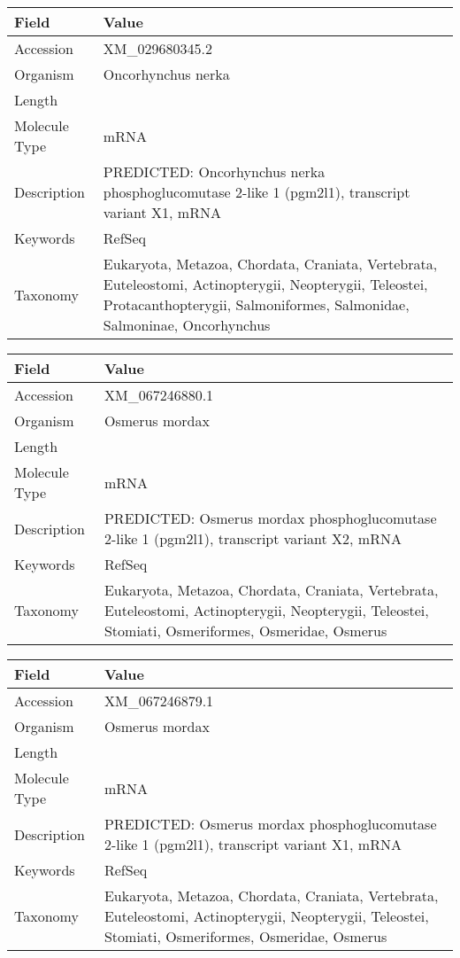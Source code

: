 \documentclass[10pt]{article}
\begin{document}
\vspace{1em}
{\footnotesize
\begin{longtable}{>{\raggedright\arraybackslash}p{4.5cm} >{\raggedright\arraybackslash}p{11.5cm}}
\textbf{Field} & \textbf{Value} \\
\hline
Accession & XM\_029680345.2 \\
Organism & Oncorhynchus nerka \\
Length & 4469 \\
Molecule Type & mRNA \\
Description & PREDICTED: Oncorhynchus nerka phosphoglucomutase 2-like 1 (pgm2l1), transcript variant X1, mRNA \\
Keywords & RefSeq \\
Taxonomy & Eukaryota, Metazoa, Chordata, Craniata, Vertebrata, Euteleostomi, Actinopterygii, Neopterygii, Teleostei, Protacanthopterygii, Salmoniformes, Salmonidae, Salmoninae, Oncorhynchus \\
\end{longtable}
}

\vspace{1em}
{\footnotesize
\begin{longtable}{>{\raggedright\arraybackslash}p{4.5cm} >{\raggedright\arraybackslash}p{11.5cm}}
\textbf{Field} & \textbf{Value} \\
\hline
Accession & XM\_067246880.1 \\
Organism & Osmerus mordax \\
Length & 3330 \\
Molecule Type & mRNA \\
Description & PREDICTED: Osmerus mordax phosphoglucomutase 2-like 1 (pgm2l1), transcript variant X2, mRNA \\
Keywords & RefSeq \\
Taxonomy & Eukaryota, Metazoa, Chordata, Craniata, Vertebrata, Euteleostomi, Actinopterygii, Neopterygii, Teleostei, Stomiati, Osmeriformes, Osmeridae, Osmerus \\
\end{longtable}
}

\vspace{1em}
{\footnotesize
\begin{longtable}{>{\raggedright\arraybackslash}p{4.5cm} >{\raggedright\arraybackslash}p{11.5cm}}
\textbf{Field} & \textbf{Value} \\
\hline
Accession & XM\_067246879.1 \\
Organism & Osmerus mordax \\
Length & 3989 \\
Molecule Type & mRNA \\
Description & PREDICTED: Osmerus mordax phosphoglucomutase 2-like 1 (pgm2l1), transcript variant X1, mRNA \\
Keywords & RefSeq \\
Taxonomy & Eukaryota, Metazoa, Chordata, Craniata, Vertebrata, Euteleostomi, Actinopterygii, Neopterygii, Teleostei, Stomiati, Osmeriformes, Osmeridae, Osmerus \\
\end{longtable}
}
\end{document}
